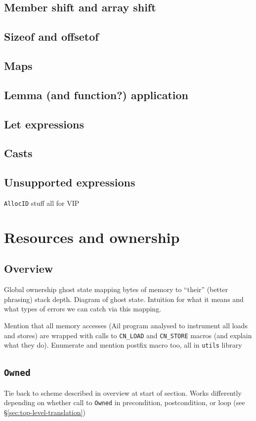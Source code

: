 \documentclass[withindex,glossary]{cam-thesis}
\begin{document}
\subsection{Member shift and array shift}
\subsection{Sizeof and offsetof}
\subsection{Maps}
\subsection{Lemma (and function?) application}
\subsection{Let expressions}
\subsection{Casts}

\subsection{Unsupported expressions}

\texttt{AllocID} stuff all for VIP


\section{Resources and ownership}

\subsection{Overview}

Global ownership ghost state mapping bytes of memory to ``their'' (better phrasing) stack depth. Diagram of ghost state. Intuition for what it means and what types of errors we can catch via this mapping. 

Mention that all memory accesses (Ail program analysed to instrument all loads and stores) are wrapped with calls to \texttt{CN\_LOAD} and \texttt{CN\_STORE} macros (and explain what they do). Enumerate and mention postfix macro too, all in \texttt{utils} library


\subsection{\texttt{Owned}}
Tie back to scheme described in overview at start of section. Works differently depending on whether call to \texttt{Owned} in precondition, postcondition, or loop (see \S\ref{sec:top-level-translation})
\end{document}
